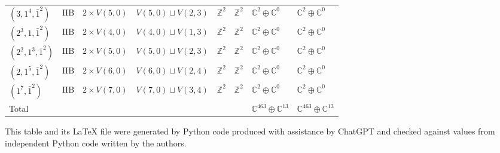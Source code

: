 \documentclass[11pt,a4paper]{article}
\begin{document}
\begin{appendix}
\begin{table}
\begin{tabular}{C{2.65cm}C{0.85cm}C{3.0cm}C{3.0cm}C{2.25cm}C{2.25cm}C{1.55cm}C{1.55cm}}
\((3, 1^{4}, \bar{1}^{2})\) & \(\mathrm{IIB}\) & \(2 \times V(5,0)\) & \(V(5,0) \sqcup V(2,3)\) & \(\mathbb{Z}^{2}\) & \(\mathbb{Z}^{2}\) & \(\mathbb{C}^{2} \oplus \mathbb{C}^{0}\) & \(\mathbb{C}^{2} \oplus \mathbb{C}^{0}\) \\
\((2^{3}, 1, \bar{1}^{2})\) & \(\mathrm{IIB}\) & \(2 \times V(4,0)\) & \(V(4,0) \sqcup V(1,3)\) & \(\mathbb{Z}^{2}\) & \(\mathbb{Z}^{2}\) & \(\mathbb{C}^{2} \oplus \mathbb{C}^{0}\) & \(\mathbb{C}^{2} \oplus \mathbb{C}^{0}\) \\
\((2^{2}, 1^{3}, \bar{1}^{2})\) & \(\mathrm{IIB}\) & \(2 \times V(5,0)\) & \(V(5,0) \sqcup V(2,3)\) & \(\mathbb{Z}^{2}\) & \(\mathbb{Z}^{2}\) & \(\mathbb{C}^{2} \oplus \mathbb{C}^{0}\) & \(\mathbb{C}^{2} \oplus \mathbb{C}^{0}\) \\
\((2, 1^{5}, \bar{1}^{2})\) & \(\mathrm{IIB}\) & \(2 \times V(6,0)\) & \(V(6,0) \sqcup V(2,4)\) & \(\mathbb{Z}^{2}\) & \(\mathbb{Z}^{2}\) & \(\mathbb{C}^{2} \oplus \mathbb{C}^{0}\) & \(\mathbb{C}^{2} \oplus \mathbb{C}^{0}\) \\
\((1^{7}, \bar{1}^{2})\) & \(\mathrm{IIB}\) & \(2 \times V(7,0)\) & \(V(7,0) \sqcup V(3,4)\) & \(\mathbb{Z}^{2}\) & \(\mathbb{Z}^{2}\) & \(\mathbb{C}^{2} \oplus \mathbb{C}^{0}\) & \(\mathbb{C}^{2} \oplus \mathbb{C}^{0}\) \\
\midrule
\textrm{Total} &  &  &  &  &  & \(\mathbb{C}^{463} \oplus \mathbb{C}^{13}\) & \(\mathbb{C}^{463} \oplus \mathbb{C}^{13}\) \\
\bottomrule
\end{tabular}

\bigskip
\begin{minipage}{0.8\textwidth}
This table and its \LaTeX{} file were generated by Python code produced with assistance by ChatGPT and checked against values from independent Python code written by the authors.
\end{minipage}

\end{table}





\end{appendix}

\clearpage

\listoftables

\clearpage
\end{document}

